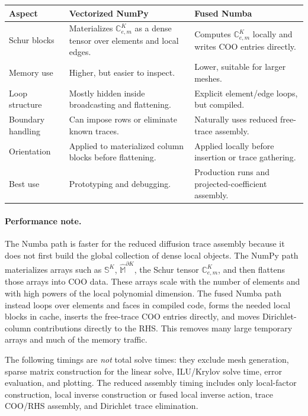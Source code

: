 \documentclass[11pt]{article}
\newcommand{\SK}{\mathbb S^K}
\newcommand{\C}{\mathbb C}
\newcommand{\Mbb}{\widehat{\mathbb M}}
\begin{document}
\begin{center}
\renewcommand{\arraystretch}{1.25}
\begin{tabular}{>{\raggedright\arraybackslash}p{} >{\raggedright\arraybackslash}p{} >{\raggedright\arraybackslash}p{}}
\toprule
Aspect & Vectorized NumPy & Fused Numba \\
\midrule
Schur blocks & Materializes $\C_{e,m}^K$ as a dense tensor over elements and local edges. & Computes $\C_{e,m}^K$ locally and writes COO entries directly. \\
Memory use & Higher, but easier to inspect. & Lower, suitable for larger meshes. \\
Loop structure & Mostly hidden inside broadcasting and flattening. & Explicit element/edge loops, but compiled. \\
Boundary handling & Can impose rows or eliminate known traces. & Naturally uses reduced free-trace assembly. \\
Orientation & Applied to materialized column blocks before flattening. & Applied locally before insertion or trace gathering. \\
Best use & Prototyping and debugging. & Production runs and projected-coefficient assembly. \\
\bottomrule
\end{tabular}
\end{center}

\paragraph{Performance note.}
The Numba path is faster for the reduced diffusion trace assembly because it
does not first build the global collection of dense local objects.  The NumPy
path materializes arrays such as $\SK$, $\Mbb^{\partial K}$, the Schur tensor
$\C_{e,m}^K$, and then flattens those arrays into COO data.  These arrays scale
with the number of elements and with high powers of the local polynomial
dimension.  The fused Numba path instead loops over elements and faces in
compiled code, forms the needed local blocks in cache, inserts the free-trace
COO entries directly, and moves Dirichlet-column contributions directly to the
RHS.  This removes many large temporary arrays and much of the memory traffic.

The following timings are \emph{not} total solve times: they exclude mesh
generation, sparse matrix construction for the linear solve, ILU/Krylov solve
time, error evaluation, and plotting.  The reduced assembly timing includes
only local-factor construction, local inverse construction or fused local
inverse action, trace COO/RHS assembly, and Dirichlet trace elimination.
\end{document}
